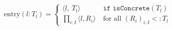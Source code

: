 \[
\text{entry}( l:T_{l}) =\begin{cases}
\langle l,\ T_{l} \rangle  & \texttt{if isConcrete}( T_{l})\\
\prod _{i:I} \langle l,R_{i} \rangle \  & \text{for all }( R_{i})_{i:I} < :T_{l}
\end{cases}
\]
